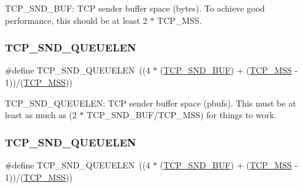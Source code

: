 T\+C\+P\+\_\+\+S\+N\+D\+\_\+\+B\+UF\+: T\+CP sender buffer space (bytes). To achieve good performance, this should be at least 2 $\ast$ T\+C\+P\+\_\+\+M\+SS. \mbox{\label{group__lwip__opts__tcp_ga9beaa47832ead4180981bfbf71074904}} 
\subsubsection{\texorpdfstring{T\+C\+P\+\_\+\+S\+N\+D\+\_\+\+Q\+U\+E\+U\+E\+L\+EN}{TCP\_SND\_QUEUELEN}\hspace{0.1cm}{\footnotesize\ttfamily [1/2]}}
{\footnotesize\ttfamily \#define T\+C\+P\+\_\+\+S\+N\+D\+\_\+\+Q\+U\+E\+U\+E\+L\+EN~((4 $\ast$ (\hyperlink{openmote-cc2538_2lwip_2test_2unit_2lwipopts_8h_a871d111968d8c6c7880ff36b93c5c4dd}{T\+C\+P\+\_\+\+S\+N\+D\+\_\+\+B\+UF}) + (\hyperlink{group__lwip__opts__tcp_gaf1ab7bb27860aa3677c387a2f3ba317b}{T\+C\+P\+\_\+\+M\+SS} -\/ 1))/(\hyperlink{group__lwip__opts__tcp_gaf1ab7bb27860aa3677c387a2f3ba317b}{T\+C\+P\+\_\+\+M\+SS}))}

T\+C\+P\+\_\+\+S\+N\+D\+\_\+\+Q\+U\+E\+U\+E\+L\+EN\+: T\+CP sender buffer space (pbufs). This must be at least as much as (2 $\ast$ T\+C\+P\+\_\+\+S\+N\+D\+\_\+\+B\+U\+F/\+T\+C\+P\+\_\+\+M\+SS) for things to work. \mbox{\label{group__lwip__opts__tcp_ga9beaa47832ead4180981bfbf71074904}} 
\subsubsection{\texorpdfstring{T\+C\+P\+\_\+\+S\+N\+D\+\_\+\+Q\+U\+E\+U\+E\+L\+EN}{TCP\_SND\_QUEUELEN}\hspace{0.1cm}{\footnotesize\ttfamily [2/2]}}
{\footnotesize\ttfamily \#define T\+C\+P\+\_\+\+S\+N\+D\+\_\+\+Q\+U\+E\+U\+E\+L\+EN~((4 $\ast$ (\hyperlink{openmote-cc2538_2lwip_2test_2unit_2lwipopts_8h_a871d111968d8c6c7880ff36b93c5c4dd}{T\+C\+P\+\_\+\+S\+N\+D\+\_\+\+B\+UF}) + (\hyperlink{group__lwip__opts__tcp_gaf1ab7bb27860aa3677c387a2f3ba317b}{T\+C\+P\+\_\+\+M\+SS} -\/ 1))/(\hyperlink{group__lwip__opts__tcp_gaf1ab7bb27860aa3677c387a2f3ba317b}{T\+C\+P\+\_\+\+M\+SS}))}

